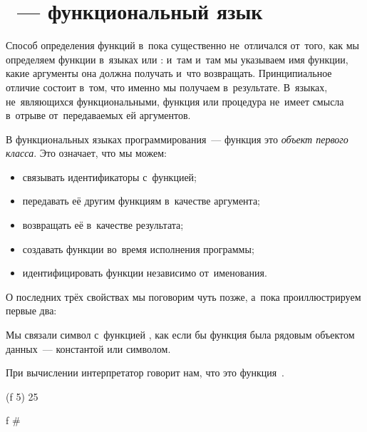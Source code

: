 %
\label{Less:functions}


\section[4]{\Scheme~--- функциональный язык}%
Способ определения функций в~\Scheme пока существенно не~отличался от~того, как мы определяем функции в~языках  или : и~там и~там мы указываем имя функции, какие аргументы она должна получать и~что возвращать. Принципиальное отличие состоит в~том, что именно мы получаем в~результате. В~языках, не~являющихся функциональными, функция или процедура не~имеет смысла в~отрыве от~передаваемых ей аргументов.

\label{first-class}В функциональных языках программирования~--- функция это \emph{объект первого класса}. Это означает, что мы можем:

\begin{itemize}[--]
 \item связывать идентификаторы с~функцией;

 \item передавать её другим функциям в~качестве аргумента;

 \item возвращать её в~качестве результата;

 \item создавать функции во~время исполнения программы;

 \item идентифицировать функции независимо от~именования.
\end{itemize}

О последних трёх свойствах мы поговорим чуть позже, а~пока проиллюстрируем первые два:

\begin{example}{Мы связали символ  с~функцией ,  как если бы функция  была рядовым объектом данных~--- константой или символом.

При вычислении  интерпретатор говорит нам, что это функция~.}
\REPL
  {(f 5)}
  {25}

\REPL
  {f}
  {\#<procedure:sqr>}
\end{example}


